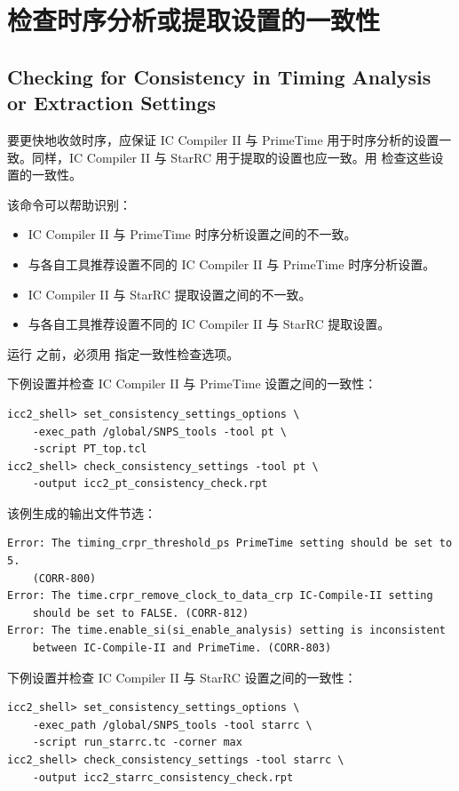 \section{检查时序分析或提取设置的一致性}
\subsection*{Checking for Consistency in Timing Analysis or Extraction Settings}

要更快地收敛时序，应保证 IC Compiler II 与 PrimeTime 用于时序分析的设置一致。同样，IC Compiler II 与 StarRC 用于提取的设置也应一致。用  检查这些设置的一致性。

该命令可以帮助识别：
\begin{itemize}
  \item IC Compiler II 与 PrimeTime 时序分析设置之间的不一致。
  \item 与各自工具推荐设置不同的 IC Compiler II 与 PrimeTime 时序分析设置。
  \item IC Compiler II 与 StarRC 提取设置之间的不一致。
  \item 与各自工具推荐设置不同的 IC Compiler II 与 StarRC 提取设置。
\end{itemize}

运行  之前，必须用  指定一致性检查选项。

下例设置并检查 IC Compiler II 与 PrimeTime 设置之间的一致性：
\begin{lstlisting}
icc2_shell> set_consistency_settings_options \
    -exec_path /global/SNPS_tools -tool pt \
    -script PT_top.tcl
icc2_shell> check_consistency_settings -tool pt \
    -output icc2_pt_consistency_check.rpt
\end{lstlisting}

该例生成的输出文件节选：
\begin{lstlisting}
Error: The timing_crpr_threshold_ps PrimeTime setting should be set to 5.
    (CORR-800)
Error: The time.crpr_remove_clock_to_data_crp IC-Compile-II setting
    should be set to FALSE. (CORR-812)
Error: The time.enable_si(si_enable_analysis) setting is inconsistent
    between IC-Compile-II and PrimeTime. (CORR-803)
\end{lstlisting}

下例设置并检查 IC Compiler II 与 StarRC 设置之间的一致性：
\begin{lstlisting}
icc2_shell> set_consistency_settings_options \
    -exec_path /global/SNPS_tools -tool starrc \
    -script run_starrc.tc -corner max
icc2_shell> check_consistency_settings -tool starrc \
    -output icc2_starrc_consistency_check.rpt
\end{lstlisting}

